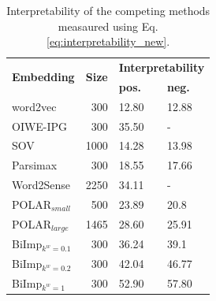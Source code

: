 \documentclass[11pt,a4paper]{article}
\def\proposedmethod{BiImp}
\begin{document}

\begin{table}
    \centering
	\begin{tabular}{lrll}
	    \hline \hline
        \multirow{2}{*}{\textbf{Embedding}} & \multirow{2}{*}{\textbf{Size}} &  \multicolumn{2}{c}{\textbf{Interpretability}}\\
                 & & \textbf{pos.} & \textbf{neg.} \\\hline \hline %
        word2vec & 300 & 12.80 & 12.88 \\
        OIWE-IPG & 300 & 35.50 & - \\
        SOV & 1000 & 14.28 & 13.98 \\
        Parsimax & 300 & 18.55 & 17.66\\
        Word2Sense & 2250 & 34.11 & -\\
        POLAR$_{small}$ & 500 & 23.89 & 20.8\\
        POLAR$_{large}$ & 1465 & 28.60 & 25.91\\
        \proposedmethod{}$_{k^w = 0.1}$ & 300 & 36.24 & 39.1\\
        \proposedmethod{}$_{k^w = 0.2}$ & 300 & 42.04 & 46.77\\
        \proposedmethod{}$_{k^w = 1}$ & 300 & 52.90 & 57.80\\
        \hline \hline
	\end{tabular}
	\caption{ Interpretability of the competing methods measaured using Eq. \ref{eq:interpretability_new}. }
	\label{tab:interp_results}
\end{table}

\end{document}
